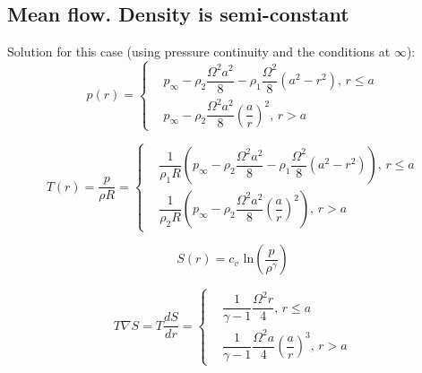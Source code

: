\subsection{Mean flow. Density is semi-constant}

Solution for this case (using pressure continuity and the conditions at $\infty$): 
\begin{equation}
	\label{MF_scd_pressure}
	p(r) = \left\{
	\begin{aligned}
		& p_{\infty} - \rho_2 \dfrac{\Omega^2 a^2}{8} - \rho_1 \dfrac{\Omega^2}{8} (a^2 - r^2), \, r \leqslant a \\
		& p_{\infty} - \rho_2 \dfrac{\Omega^2 a^2}{8} \left(\dfrac{a}{r}\right)^2, \, r > a
	\end{aligned}
	\right.
\end{equation}

\begin{equation}
	T(r) = \dfrac{p}{\rho R} = \left\{
	\begin{aligned}
		& \dfrac{1}{\rho_1 R}\left( p_{\infty} - \rho_2 \dfrac{\Omega^2 a^2}{8} - \rho_1 \dfrac{\Omega^2}{8} (a^2 - r^2) \right), \, r \leqslant a \\
		& \dfrac{1}{\rho_2 R}\left( p_{\infty} - \rho_2 \dfrac{\Omega^2 a^2}{8}\left(\dfrac{a}{r}\right)^2\right), \, r > a
	\end{aligned}
	\right.
\end{equation}

\begin{equation}
	S(r) = c_{v} \text{ ln} \left(\dfrac{p}{\rho^{\gamma}}\right)
\end{equation}

\begin{equation}
	T\nabla S = T \dfrac{dS}{dr} = \left\{
	\begin{aligned}
		& \dfrac{1}{\gamma - 1} \dfrac{\Omega^2 r}{4}, \, r \leqslant a \\
		& \dfrac{1}{\gamma - 1} \dfrac{\Omega^2 a}{4} \left(\dfrac{a}{r}\right)^3, \, r > a
	\end{aligned}
	\right.
\end{equation}